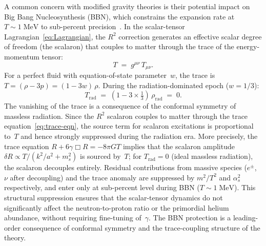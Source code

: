 \documentclass[12pt,a4paper]{article}
\theoremstyle{definition}
\theoremstyle{plain}
\theoremstyle{remark}
\begin{document}
A common concern with modified gravity theories is their potential
impact on Big Bang Nucleosynthesis (BBN), which constrains the expansion
rate at $T \sim 1\;\mathrm{MeV}$ to sub-percent
precision~\cite{SotiriouFaraoni2010}. In the scalar-tensor
Lagrangian~\eqref{eq:Lagrangian}, the $R^{2}$ correction generates an
effective scalar degree of freedom (the scalaron) that couples to
matter through the trace of the energy-momentum tensor:
\begin{equation}\label{eq:trace}
  T \;=\; g^{\mu\nu}\,T_{\mu\nu}.
\end{equation}
For a perfect fluid with equation-of-state parameter~$w$, the trace is
$T = (\rho - 3p) = (1 - 3w)\,\rho$. During the radiation-dominated
epoch ($w = 1/3$):
\begin{equation}\label{eq:trace-rad}
  T_{\mathrm{rad}} \;=\; (1 - 3 \times \tfrac{1}{3})\,\rho_{\mathrm{rad}}
  \;=\; 0.
\end{equation}
The vanishing of the trace is a consequence of the conformal symmetry
of massless radiation. Since the $R^{2}$ scalaron couples to matter
through the trace equation~\eqref{eq:trace-eqn}, the source term for
scalaron excitations is proportional to~$T$ and hence strongly
suppressed during the radiation era.  More precisely, the trace equation
$R + 6\gamma\Box R = -8\pi GT$ implies that the scalaron amplitude
$\delta R \propto T/(k^2/a^2 + m_s^2)$ is sourced by~$T$; for
$T_{\mathrm{rad}} = 0$ (ideal massless radiation), the scalaron
decouples entirely.  Residual contributions from massive species
($e^{\pm}$, $\nu$ after decoupling) and the trace anomaly are
suppressed by $m^2/T^2$ and $\alpha_s^2$ respectively, and enter only
at sub-percent level during BBN ($T \sim 1\;\mathrm{MeV}$).
This structural suppression ensures that the scalar-tensor dynamics
do not significantly affect the neutron-to-proton ratio or the
primordial helium abundance, without requiring fine-tuning of~$\gamma$.
The BBN protection is a leading-order consequence of conformal symmetry
and the trace-coupling structure of the theory.
\end{document}
